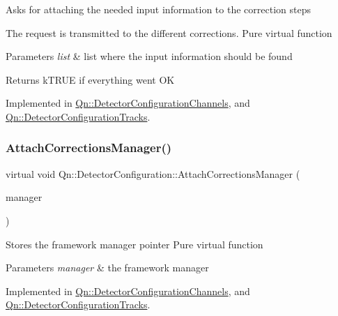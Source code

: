 Asks for attaching the needed input information to the correction steps

The request is transmitted to the different corrections. Pure virtual function 
\begin{DoxyParams}{Parameters}
{\em list} & list where the input information should be found \\
\hline
\end{DoxyParams}
\begin{DoxyReturn}{Returns}
k\+T\+R\+UE if everything went OK 
\end{DoxyReturn}


Implemented in \mbox{\hyperlink{classQn_1_1DetectorConfigurationChannels_ac02f3bf7815650e06a3b85f3c0bcd0e0}{Qn\+::\+Detector\+Configuration\+Channels}}, and \mbox{\hyperlink{classQn_1_1DetectorConfigurationTracks_afd9a049e63b16797cd03e6b54d8e209e}{Qn\+::\+Detector\+Configuration\+Tracks}}.

\mbox{\label{classQn_1_1DetectorConfiguration_a512c77d73e0e6453607f7ae7e2e8f72b}} 
\subsubsection{\texorpdfstring{Attach\+Corrections\+Manager()}{AttachCorrectionsManager()}}
{\footnotesize\ttfamily virtual void Qn\+::\+Detector\+Configuration\+::\+Attach\+Corrections\+Manager (\begin{DoxyParamCaption}\item[{\mbox{\hyperlink{classQn_1_1CorrectionCalculator}{Correction\+Calculator}} $\ast$}]{manager }\end{DoxyParamCaption})\hspace{0.3cm}{\ttfamily [pure virtual]}}

Stores the framework manager pointer Pure virtual function 
\begin{DoxyParams}{Parameters}
{\em manager} & the framework manager \\
\hline
\end{DoxyParams}


Implemented in \mbox{\hyperlink{classQn_1_1DetectorConfigurationChannels_a074acfba4bc0d41df71d53b98d682f57}{Qn\+::\+Detector\+Configuration\+Channels}}, and \mbox{\hyperlink{classQn_1_1DetectorConfigurationTracks_a555a9d8add7610402173b755b77bf57d}{Qn\+::\+Detector\+Configuration\+Tracks}}.

